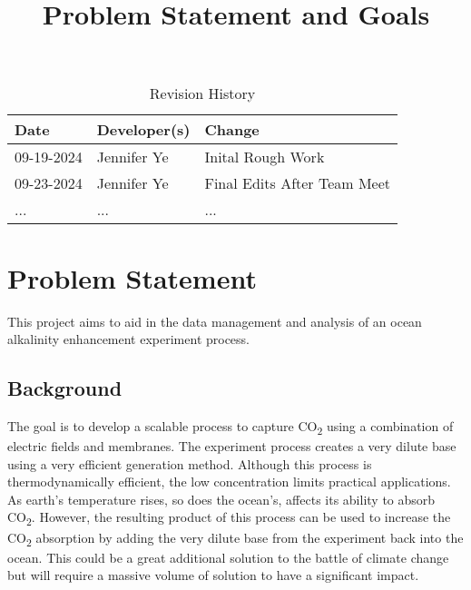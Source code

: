 \documentclass{article}
\title{Problem Statement and Goals\\\progname}
\author{\authname}
\date{}
\begin{document}
\maketitle

\begin{table}[hp]
\caption{Revision History} \label{TblRevisionHistory}
\begin{tabularx}{\textwidth}{llX}
\toprule
\textbf{Date} & \textbf{Developer(s)} & \textbf{Change}\\
\midrule
09-19-2024 & Jennifer Ye & Inital Rough Work \\
09-23-2024 & Jennifer Ye & Final Edits After Team Meet\\
... & ... & ...\\
\bottomrule
\end{tabularx}
\end{table}


\section{Problem Statement}
This project aims to aid in the data management and analysis of an ocean
alkalinity enhancement experiment process.

\subsection{Background}
The goal is to develop a scalable process to capture CO\textsubscript{2} using a
combination of electric fields and membranes. The experiment process creates a
very dilute base using a very efficient generation method. Although this process
is thermodynamically efficient, the low concentration limits practical
applications. As earth's temperature rises, so does the ocean's, affects its
ability to absorb CO\textsubscript{2}. However, the resulting product of this
process can be used to increase the CO\textsubscript{2} absorption by adding the
very dilute base from the experiment back into the ocean. This could be a great
additional solution to the battle of climate change but will require a massive
volume of solution to have a significant impact.
\end{document}
